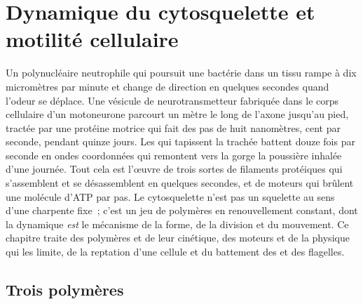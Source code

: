 \chapter{Dynamique du cytosquelette et motilité cellulaire}\label{ch:b3:cytoskeleton-motility}

Un polynucléaire neutrophile qui poursuit une bactérie dans un tissu
rampe à dix micromètres par minute et change de direction en quelques
secondes quand l'odeur se déplace. Une vésicule de neurotransmetteur
fabriquée dans le corps cellulaire d'un motoneurone parcourt un mètre
le long de l'axone jusqu'au pied, tractée par une protéine motrice qui
fait des pas de huit nanomètres, cent par seconde, pendant quinze
jours. Les  qui tapissent la trachée battent douze fois par seconde
en ondes coordonnées qui remontent vers la gorge la poussière inhalée
d'une journée. Tout cela est l'œuvre de trois sortes de filaments
protéiques qui s'assemblent et se désassemblent en quelques secondes,
et de moteurs qui brûlent une molécule d'ATP par pas. Le cytosquelette
n'est pas un squelette au sens d'une charpente fixe~; c'est un jeu de
polymères en renouvellement constant, dont la dynamique \emph{est} le
mécanisme de la forme, de la division et du mouvement. Ce chapitre
traite des polymères et de leur cinétique, des moteurs et de la
physique qui les limite, de la reptation d'une cellule et du battement
des  et des flagelles.

\section{Trois polymères}

